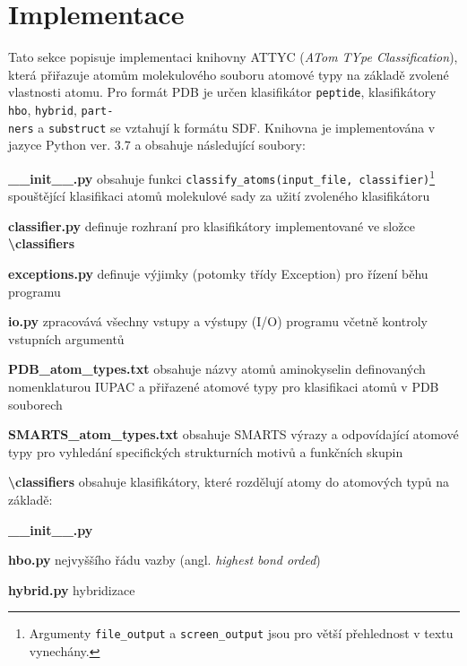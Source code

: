 \chapter{Implementace}
Tato sekce popisuje implementaci knihovny ATTYC (\textit{ATom TYpe Classification}), která přiřazuje atomům molekulového souboru atomové typy na základě zvolené vlastnosti atomu. Pro formát PDB je určen klasifikátor \verb|peptide|, klasifikátory \verb|hbo|, \verb|hybrid|, \verb|part-|\\\verb|ners| a \verb|substruct| se vztahují k formátu  SDF. Knihovna je implementována v jazyce Python ver. 3.7 a obsahuje následující soubory:

\vspace{0.4cm}
\noindent {} \textbf{\_\_init\_\_.py} obsahuje funkci \verb|classify_atoms(input_file, classifier)|\footnote{Argumenty \texttt{file\_output} a \texttt{screen\_output} jsou pro větší přehlednost v textu vynechány.}
spouštějící klasifikaci atomů molekulové sady za uži\-tí zvoleného klasifikátoru

\medskip
\noindent \textbf{classifier.py} definuje rozhraní pro klasifikátory implementované ve složce \textbf{\textbackslash classifiers}

\medskip
\noindent \textbf{exceptions.py} definuje výjimky (potomky třídy Exception) pro řízení běhu programu

\medskip
\noindent {}\textbf{io.py} zpracovává všechny vstupy a výstupy (I/O) programu včetně kontroly vstupních argumentů 

\medskip
\noindent {}\textbf{PDB\_atom\_types.txt} obsahuje názvy atomů aminokyselin definovaných nomenklaturou IUPAC a přiřazené atomové typy pro klasifikaci atomů v PDB souborech

\medskip
\noindent {}\textbf{SMARTS\_atom\_types.txt} obsahuje SMARTS výrazy a odpovídající atomové typy pro vyhledání specifických strukturních motivů a funkčních skupin 

\medskip
\noindent\textbf{\textbackslash classifiers} obsahuje klasifikátory, které rozdělují atomy do atomových typů na základě:

\medskip
\textbf{\_\_init\_\_.py}

\vspace{0.01cm}
\textbf{hbo.py} nejvyššího řádu vazby (angl. \textit{highest bond orded})

\vspace{0.01cm}
\textbf{hybrid.py} hybridizace

